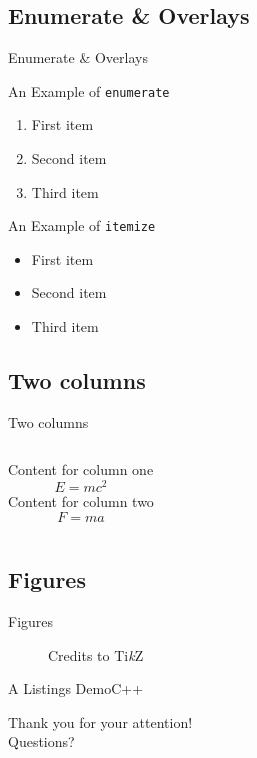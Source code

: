 \documentclass[
10pt,
aspectratio=169,
]{beamer}
\begin{document}
\subsection{Enumerate \& Overlays}

\begin{frame}[c]{Enumerate \& Overlays}
	
{\large An Example of \texttt{enumerate}}
	\begin{enumerate}[<+->]
		\item First item
		\item Second item
		\item Third item
	\end{enumerate}
\vfill
{\large An Example of \texttt{itemize}}	
	\begin{itemize}[<+->]
	\item First item
	\item Second item
	\item Third item
	\end{itemize}
\end{frame}	

\subsection{Two columns}
\begin{frame}[c]{Two columns}
	
\begin{columns}[onlytextwidth]
	Content for column one
	\begin{equation}
	E = mc^2
	\end{equation}
	Content for column two
	\begin{equation}
	F=ma
	\end{equation}
\end{columns}
	
\end{frame}	

\subsection{Figures}
\begin{frame}[c]{Figures}
	\begin{figure}
		\centering
		\caption{Credits to Ti\textit{k}Z}
	\end{figure}
\end{frame}	

\begin{frame}{A Listings Demo}{C++}
	\lstI
\end{frame}
\begin{frame}[plain]
	\vfill
	\centering
	{
		\centering \Huge \color{white} Thank you for your attention!\\[10pt]Questions?
	}
	\vfill
\end{frame}
\end{document}
